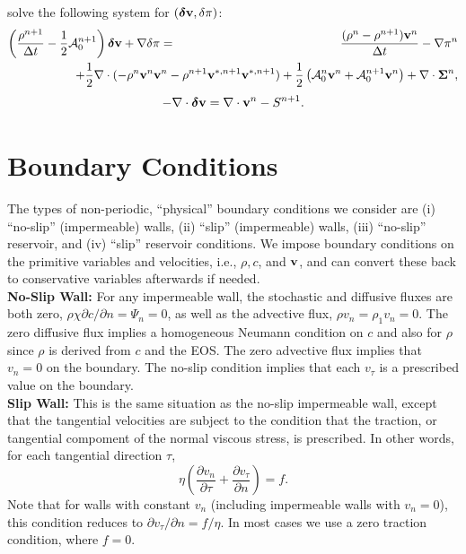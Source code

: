 \documentclass[final]{siamltex}
\def\vb {{\bf v}}
\def\deltab {\boldsymbol{\delta}}
\def\Sigmab {\boldsymbol{\Sigma}}
\def\half   {\frac{1}{2}}
\begin{document}
solve the following system for $(\deltab\vb,\delta\pi)$:
\begin{eqnarray}
\left(\frac{\rho^{n+1}}{\Delta t} - \half\mathcal{A}_0^{n+1}\right)\deltab\vb + \nabla\delta\pi &=& \frac{(\rho^n-\rho^{n+1})\vb^n}{\Delta t} -\nabla\pi^n\nonumber\\
&&\hspace{-1.25in}+ \half\nabla\cdot(-\rho^n\vb^n\vb^n - \rho^{n+1}\vb^{*,n+1}\vb^{*,n+1}) + \half\left(\mathcal{A}^n_0\vb^n + \mathcal{A}^{n+1}_0\vb^n\right) + \nabla\cdot\Sigmab^n,
\end{eqnarray}
\begin{equation}
-\nabla\cdot\deltab\vb = \nabla\cdot\vb^n - S^{n+1}.
\end{equation}

\section{Boundary Conditions}
The types of non-periodic, ``physical'' boundary conditions we consider are 
(i) ``no-slip'' (impermeable) walls,
(ii) ``slip'' (impermeable) walls,
(iii) ``no-slip'' reservoir, and
(iv) ``slip'' reservoir conditions.
We impose boundary conditions on the primitive variables and velocities,
i.e., $\rho,c$, and $\vb$, and can convert these back to conservative
variables afterwards if needed.\\

{\bf No-Slip Wall:}  For any impermeable wall, the stochastic and diffusive
fluxes are both zero, $\rho\chi\partial c/\partial n = \Psi_n = 0$, as well as the 
advective flux, $\rho v_n = \rho_1 v_n = 0$.  The zero
diffusive flux implies a homogeneous Neumann condition on $c$ and also for $\rho$ since $\rho$
is derived from $c$ and the EOS.  The zero advective flux implies that $v_n=0$ on the
boundary.  The no-slip condition implies that each $v_{\tau}$ is a prescribed value
on the boundary.\\

{\bf Slip Wall:}  This is the same situation as the no-slip impermeable
wall, except that the tangential velocities are subject to the condition that the
traction, or tangential compoment of the normal viscous stress, is prescribed.
In other words, for each tangential direction $\tau$,
\begin{equation}
\eta\left(\frac{\partial v_n}{\partial\tau} + \frac{\partial v_{\tau}}{\partial n}\right) = f.\label{eq:free slip}
\end{equation}
Note that for walls with constant $v_n$ (including impermeable walls with $v_n=0$),
this condition reduces to $\partial v_{\tau}/\partial n=f/\eta$.  In most cases we
use a zero traction condition, where $f=0$.\\
\end{document}
